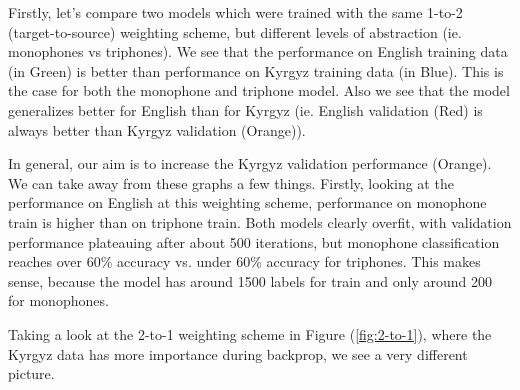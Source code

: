 \documentclass[a4paper]{article}
\begin{document}
Firstly, let's compare two models which were trained with the same 1-to-2 (target-to-source) weighting scheme, but different levels of abstraction (ie. monophones vs triphones). We see that the performance on English training data (in Green) is better than performance on Kyrgyz training data (in Blue). This is the case for both the monophone and triphone model. Also we see that the model generalizes better for English than for Kyrgyz (ie. English validation (Red) is always better than Kyrgyz validation (Orange)).

In general, our aim is to increase the Kyrgyz validation performance (Orange). We can take away from these graphs a few things. Firstly, looking at the performance on English at this weighting scheme, performance on monophone train is higher than on triphone train. Both models clearly overfit, with validation performance plateauing after about 500 iterations, but monophone classification reaches over 60\% accuracy vs. under 60\% accuracy for triphones. This makes sense, because the model has around 1500 labels for train and only around 200 for monophones.




Taking a look at the 2-to-1 weighting scheme in Figure (\ref{fig:2-to-1}), where the Kyrgyz data has more importance during backprop, we see a very different picture.
\end{document}

